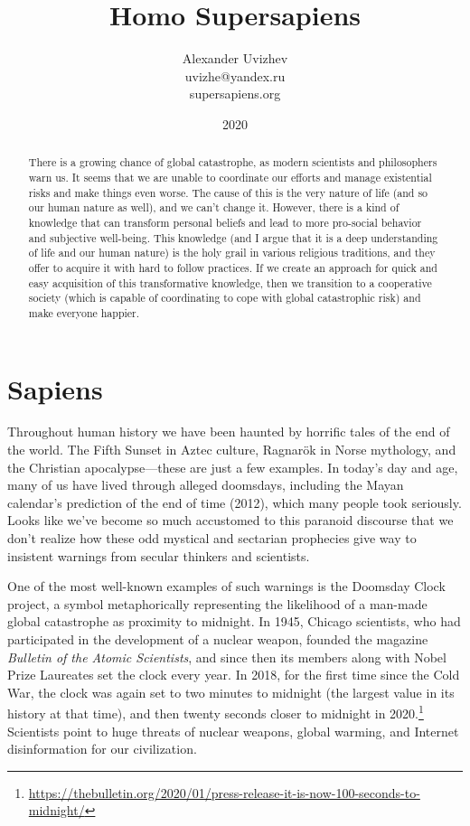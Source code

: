 \documentclass[12pt]{report}
\title{\textbf{Homo Supersapiens}}
\author{Alexander Uvizhev\\
		uvizhe@yandex.ru\\
		supersapiens.org}
\date{2020}
\begin{document}
\maketitle

\begin{abstract}
There is a growing chance of global catastrophe, as modern scientists and philosophers warn us. It seems that we are unable to coordinate our efforts and manage existential risks and make things even worse. The cause of this is the very nature of life (and so our human nature as well), and we can't change it. However, there is a kind of knowledge that can transform personal beliefs and lead to more pro-social behavior and subjective well-being. This knowledge (and I argue that it is a deep understanding of life and our human nature) is the holy grail in various religious traditions, and they offer to acquire it with hard to follow practices. If we create an approach for quick and easy acquisition of this transformative knowledge, then we transition to a cooperative society (which is capable of coordinating to cope with global catastrophic risk) and make everyone happier.
\end{abstract}

\chapter*{Sapiens}

Throughout human history we have been haunted by horrific tales of the end of the world. The Fifth Sunset in Aztec culture, Ragnarök in Norse mythology, and the Christian apocalypse\thinspace---\thinspace these are just a few examples. In today’s day and age, many of us have lived through alleged doomsdays, including the Mayan calendar’s prediction of the end of time (2012), which many people took seriously. Looks like we’ve become so much accustomed to this paranoid discourse that we don’t realize how these odd mystical and sectarian prophecies give way to insistent warnings from secular thinkers and scientists.

\noindent One of the most well-known examples of such warnings is the Doomsday Clock project, a symbol metaphorically representing the likelihood of a man-made global catastrophe as proximity to midnight. In 1945, Chicago scientists, who had participated in the development of a nuclear weapon, founded the magazine \textit{Bulletin of the Atomic Scientists}, and since then its members along with Nobel Prize Laureates set the clock every year. In 2018, for the first time since the Cold War, the clock was again set to two minutes to midnight (the largest value in its history at that time), and then twenty seconds closer to midnight in 2020.\footnote{\url{https://thebulletin.org/2020/01/press-release-it-is-now-100-seconds-to-midnight/}} Scientists point to huge threats of nuclear weapons, global warming, and Internet disinformation for our civilization.
\end{document}
